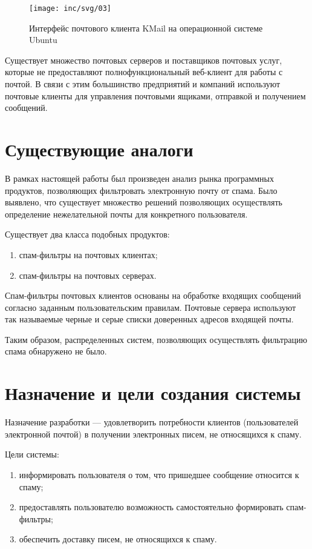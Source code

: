 \begin{figure}
  \centering
  \texttt{[image: inc/svg/03]}
  \caption{Интерфейс почтового клиента KMail на операционной системе Ubuntu}
  \label{fig:fig03}
\end{figure}

Существует множество почтовых серверов и поставщиков почтовых услуг, которые не предоставляют полнофункциональный веб-клиент  для работы  с почтой. В связи с этим большинство предприятий и компаний используют почтовые клиенты для управления почтовыми ящиками, отправкой и получением сообщений.


\section{Существующие аналоги}
В рамках настоящей работы был произведен анализ рынка программных продуктов, позволяющих фильтровать электронную почту от спама. Было выявлено, что существует множество решений позволяющих осуществлять определение нежелательной почты для конкретного пользователя. 

Существует два класса подобных продуктов:
\begin{enumerate}
	\item спам-фильтры на почтовых клиентах;
	\item спам-фильтры на почтовых серверах. 
\end{enumerate}

Спам-фильтры почтовых клиентов основаны на обработке входящих сообщений согласно заданным пользовательским правилам.  Почтовые сервера используют так называемые черные и серые списки доверенных адресов входящей почты.

Таким образом, распределенных систем, позволяющих осуществлять фильтрацию спама обнаружено не было.


\section{Назначение и цели создания системы}
Назначение разработки --- удовлетворить потребности клиентов (пользователей электронной почтой) в получении электронных писем, не относящихся к спаму.

Цели системы:
\begin{enumerate}
	\item информировать пользователя о том, что пришедшее сообщение относится к спаму;
	\item предоставлять пользователю возможность самостоятельно формировать спам-фильтры;
	\item обеспечить доставку писем, не относящихся к спаму.
\end{enumerate}

